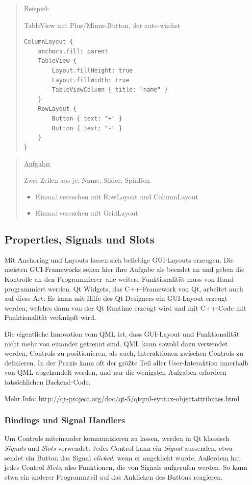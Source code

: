 \documentclass[a4paper]{article}
\begin{document}
\begin{quote}
\uline{Beispiel:}

TableView mit Plus/Minus-Button, der auto-wächst
\begin{verbatim}
ColumnLayout {
    anchors.fill: parent
    TableView {
        Layout.fillHeight: true
        Layout.fillWidth: true
        TableViewColumn { title: "name" }
    }
    RowLayout {
        Button { text: "+" }
        Button { text: "-" }
    }
}
\end{verbatim}
\end{quote}

\begin{quote}
\uline{Aufgabe:}

Zwei Zeilen aus je: Name, Slider, SpinBox
\begin{itemize}
\item Einmal versuchen mit RowLayout und ColumnLayout
\item Einmal versuchen mit GridLayout
\end{itemize}
\end{quote}
\subsection{Properties, Signals und Slots}
\label{sec-1-3}
Mit Anchoring und Layouts lassen sich beliebige GUI-Layouts erzeugen. Die meisten GUI-Frameworks sehen hier ihre Aufgabe als beendet an und geben die Kontrolle an den Programmierer--alle weitere Funktionalität muss von Hand programmiert werden. Qt Widgets, das C++-Framework von Qt, arbeitet auch auf diese Art: Es kann mit Hilfe des Qt Designers ein GUI-Layout erzeugt werden, welches dann von der Qt Runtime erzeugt wird und mit C++-Code mit Funktionalität verknüpft wird.

Die eigentliche Innovation vom QML ist, dass GUI-Layout und Funktionalität nicht mehr von einander getrennt sind. QML kann sowohl dazu verwendet werden, Controls zu positionieren, als auch, Interaktionen zwischen Controls zu definieren. In der Praxis kann oft der größte Teil aller User-Interaktion innerhalb von QML abgehandelt werden, und nur die wenigsten Aufgaben erfordern tatsächlichen Backend-Code.

Mehr Info: \url{http://qt-project.org/doc/qt-5/qtqml-syntax-objectattributes.html}

\subsubsection{Bindings und Signal Handlers}
\label{sec-1-3-1}
Um Controls miteinander kommunizieren zu lassen, werden in Qt klassisch \emph{Signals} und \emph{Slots} verwendet. Jedes Control kann ein \emph{Signal} aussenden, etwa sendet ein Button das Signal \emph{clicked}, wenn er angeklickt wurde. Außerdem hat jedes Control \emph{Slots}, also Funktionen, die von Signals aufgerufen werden. So kann etwa ein anderer Programmteil auf das Anklicken des Buttons reagieren.
\end{document}
